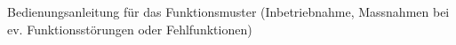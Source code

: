 \documentclass[../../main.tex]{subfiles}
\begin{document}
\begin{Huge} 
    \textbf{\color{red}{TODO: Bedienungsanleitung Software}}
\end{Huge}

Bedienungsanleitung für das Funktionsmuster (Inbetriebnahme, Massnahmen bei ev. Funktionsstörungen oder Fehlfunktionen) 
\end{document}
